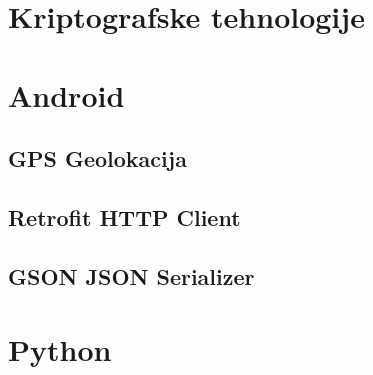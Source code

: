 %
%
%
\section{Kriptografske tehnologije}
\section{Android}
\subsection{GPS Geolokacija}
\subsection{Retrofit HTTP Client}
\subsection{GSON JSON Serializer}
\section{Python}